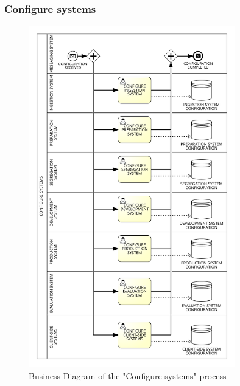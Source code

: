 \subsubsection{Configure systems}
\label{sec:configure_systems}

\begin{figure}[H]
\centering
\includegraphics[width=0.8\textwidth]{figures/Business Diagram - Configure Systems.png}
\caption{Business Diagram of the "Configure systems" process}
\label{fig:configure_systems}
\end{figure}